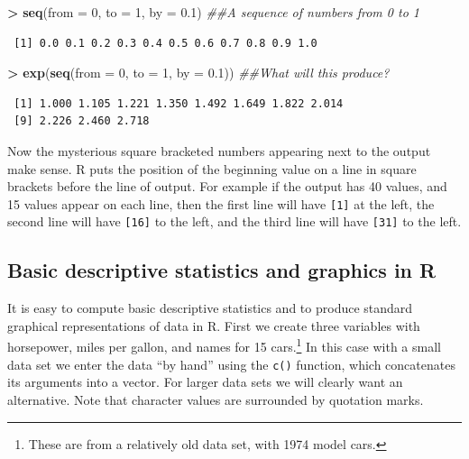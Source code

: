 \documentclass[]{krantz}
\makeatletter
\newenvironment{Shaded}{\begin{snugshade}}{\end{snugshade}}
\newcommand{\CommentTok}[1]{\textcolor[rgb]{0.37,0.37,0.37}{\textit{#1}}}
\newcommand{\DataTypeTok}[1]{\textcolor[rgb]{0.27,0.27,0.27}{#1}}
\newcommand{\DecValTok}[1]{\textcolor[rgb]{0.06,0.06,0.06}{#1}}
\newcommand{\FloatTok}[1]{\textcolor[rgb]{0.06,0.06,0.06}{#1}}
\newcommand{\KeywordTok}[1]{\textcolor[rgb]{0.27,0.27,0.27}{\textbf{#1}}}
\newcommand{\NormalTok}[1]{#1}
\newcommand{\OperatorTok}[1]{\textcolor[rgb]{0.43,0.43,0.43}{\textbf{#1}}}
\newcommand{\StringTok}[1]{\textcolor[rgb]{0.5,0.5,0.5}{#1}}
\newenvironment{kframe}{%
\medskip{}
\setlength{\fboxsep}{.8em}
 \def\at@end@of@kframe{}%
 \ifinner\ifhmode%
  \def\at@end@of@kframe{\end{minipage}}%
  \begin{minipage}{\columnwidth}%
 \fi\fi%
 \def\FrameCommand##1{\hskip\@totalleftmargin \hskip-\fboxsep
 \colorbox{shadecolor}{##1}\hskip-\fboxsep
     \hskip-\linewidth \hskip-\@totalleftmargin \hskip\columnwidth}%
 \MakeFramed {\advance\hsize-\width
   \@totalleftmargin\z@ \linewidth\hsize
   \@setminipage}}%
 {\par\unskip\endMakeFramed%
 \at@end@of@kframe}
\renewenvironment{Shaded}{\begin{kframe}}{\end{kframe}}
\makeatother
\begin{document}
\begin{Shaded}
\begin{Highlighting}[]
\OperatorTok{>}\StringTok{ }\KeywordTok{seq}\NormalTok{(}\DataTypeTok{from =} \DecValTok{0}\NormalTok{, }\DataTypeTok{to =} \DecValTok{1}\NormalTok{, }\DataTypeTok{by =} \FloatTok{0.1}\NormalTok{)  }\CommentTok{##A sequence of numbers from 0 to 1}
\end{Highlighting}
\end{Shaded}

\begin{verbatim}
 [1] 0.0 0.1 0.2 0.3 0.4 0.5 0.6 0.7 0.8 0.9 1.0
\end{verbatim}

\begin{Shaded}
\begin{Highlighting}[]
\OperatorTok{>}\StringTok{ }\KeywordTok{exp}\NormalTok{(}\KeywordTok{seq}\NormalTok{(}\DataTypeTok{from =} \DecValTok{0}\NormalTok{, }\DataTypeTok{to =} \DecValTok{1}\NormalTok{, }\DataTypeTok{by =} \FloatTok{0.1}\NormalTok{))  }\CommentTok{##What will this produce?}
\end{Highlighting}
\end{Shaded}

\begin{verbatim}
 [1] 1.000 1.105 1.221 1.350 1.492 1.649 1.822 2.014
 [9] 2.226 2.460 2.718
\end{verbatim}

Now the mysterious square bracketed numbers appearing next to the output make sense. R puts the position of the beginning value on a line in square brackets before the line of output. For example if the output has 40 values, and 15 values appear on each line, then the first line will have \texttt{{[}1{]}} at the left, the second line will have \texttt{{[}16{]}} to the left, and the third line will have \texttt{{[}31{]}} to the left.

\hypertarget{dec}{%
\subsection{Basic descriptive statistics and graphics in R}\label{dec}}

It is easy to compute basic descriptive statistics and to produce standard graphical representations of data in R. First we create three variables with horsepower, miles per gallon, and names for 15 cars.\footnote{These are from a relatively old data set, with 1974 model cars.} In this case with a small data set we enter the data ``by hand'' using the \texttt{c()} function, which concatenates its arguments into a vector. For larger data sets we will clearly want an alternative. Note that character values are surrounded by quotation marks.
\end{document}
